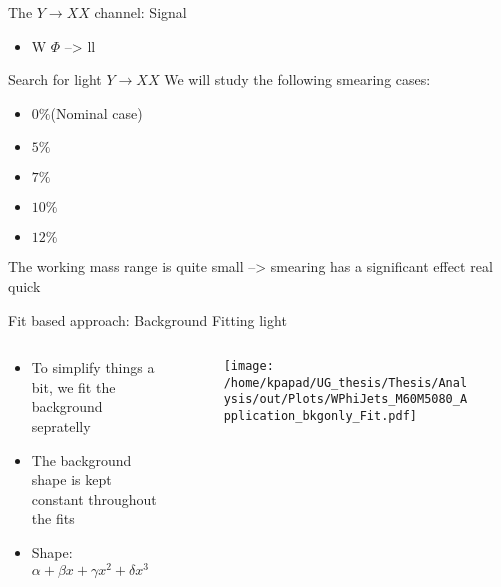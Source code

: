 \documentclass[bigger]{beamer}
\begin{document}
\begin{frame}[label={sec:orgaa2d4f4}]{The \(Y \rightarrow XX\) channel: Signal}
\begin{itemize}
\item W \(\Phi\) --> ll
\end{itemize}
\end{frame}

\begin{frame}[label={sec:orgebea367}]{Search for light \(Y \rightarrow XX\)}
We will study the following smearing cases:
\begin{itemize}
\item \(0\%\)(Nominal case)
\item \(5\%\)
\item \(7\%\)
\item \(10\%\)
\item \(12\%\)
\end{itemize}
The working mass range is quite small --> smearing has a significant effect real quick 
\end{frame}
\begin{frame}[label={sec:org40e8aeb}]{Fit based approach: Background Fitting light}
\begin{columns}
\begin{column}{0.5\columnwidth}
\begin{itemize}
\item To simplify things a bit, we fit the background sepratelly
\item The background shape is kept constant throughout the fits
\item Shape: \(\alpha + \beta x + \gamma x^2 + \delta x^3\)
\end{itemize}
\end{column}
\begin{column}{0.5\columnwidth}
\begin{figure}[h]
\centering
\texttt{[image: /home/kpapad/UG\_thesis/Thesis/Analysis/out/Plots/WPhiJets\_M60M5080\_Application\_bkgonly\_Fit.pdf]}
\end{figure}
\end{column}
\end{columns}
\end{frame}
\end{document}
